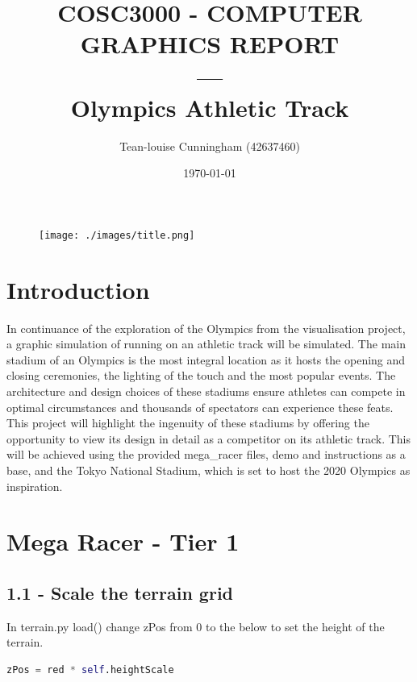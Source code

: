 \documentclass[a4 paper, 12pt]{article}
\title{COSC3000 - COMPUTER GRAPHICS REPORT \\ --- \\Olympics Athletic Track}
\author{Tean-louise Cunningham (42637460)}
\date{\today}
\begin{document}
\maketitle
    \begin{figure} [H]
        \centering
        \texttt{[image: ./images/title.png]}                  
    \end{figure}  


\pagebreak
\tableofcontents
\pagebreak
\listoffigures

\pagebreak
\section{Introduction}
In continuance of the exploration of the Olympics from the visualisation project, a graphic simulation of running on an athletic track will be simulated. The main stadium of an Olympics is the most integral location as it hosts the opening and closing ceremonies, the lighting of the touch and the most popular events. The architecture and design choices of these stadiums ensure athletes can compete in optimal circumstances and thousands of spectators can experience these feats. This project will highlight the ingenuity of these stadiums by offering the opportunity to view its design in detail as a competitor on its athletic track. This will be achieved using the provided mega\_racer files, demo and instructions as a base, and the Tokyo National Stadium, which is set to host the 2020 Olympics as inspiration.

\section{Mega Racer - Tier 1}

\subsection{1.1 - Scale the terrain grid}
In terrain.py load() change zPos from 0 to the below to set the height of the terrain.    
    \begin{lstlisting}[language=python]
    zPos = red * self.heightScale
    \end{lstlisting}
\end{document}
